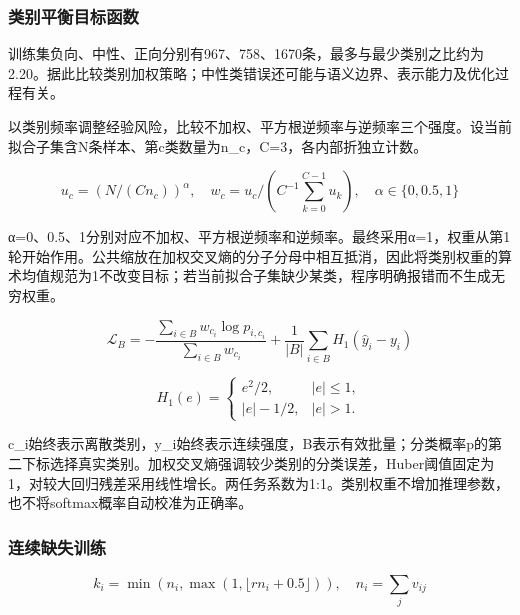 \hypertarget{q2-ux7c7bux522bux5e73ux8861ux76eeux6807ux51fdux6570}{%
\subsubsection{类别平衡目标函数}\label{q2-ux7c7bux522bux5e73ux8861ux76eeux6807ux51fdux6570}}

训练集负向、中性、正向分别有967、758、1670条，最多与最少类别之比约为2.20。据此比较类别加权策略；中性类错误还可能与语义边界、表示能力及优化过程有关。

以类别频率调整经验风险\cite{q2-ref6,q2-ref7}，比较不加权、平方根逆频率与逆频率三个强度。设当前拟合子集含N条样本、第c类数量为n\_c，C=3，各内部折独立计数。

\begin{equation}
u_c=(N/(C n_c))^\alpha,\quad w_c=u_c/(C^{-1}\sum_{k=0}^{C-1}u_k),\quad\alpha\in\{0,0.5,1\}\label{q2-eq11}
\end{equation}

α=0、0.5、1分别对应不加权、平方根逆频率和逆频率。最终采用α=1，权重从第1轮开始作用。公共缩放在加权交叉熵的分子分母中相互抵消，因此将类别权重的算术均值规范为1不改变目标；若当前拟合子集缺少某类，程序明确报错而不生成无穷权重。

\begin{equation}
\mathcal L_B=-\frac{\sum_{i\in B}w_{c_i}\log p_{i,c_i}}{\sum_{i\in B}w_{c_i}}+\frac{1}{|B|}\sum_{i\in B}H_1(\hat y_i-y_i)\label{q2-eq12}
\end{equation}

\begin{equation}
H_1(e)=\begin{cases}e^2/2,&|e|\le1,\\|e|-1/2,&|e|>1.\end{cases}\label{q2-eq13}
\end{equation}

c\_i始终表示离散类别，y\_i始终表示连续强度，B表示有效批量；分类概率p的第二下标选择真实类别。加权交叉熵强调较少类别的分类误差，Huber阈值固定为1，对较大回归残差采用线性增长。两任务系数为1:1。类别权重不增加推理参数，也不将softmax概率自动校准为正确率。

\hypertarget{q2-ux8fdeux7eedux7f3aux5931ux8badux7ec3}{%
\subsubsection{连续缺失训练}\label{q2-ux8fdeux7eedux7f3aux5931ux8badux7ec3}}

\begin{equation}
k_i=\min(n_i,\max(1,\lfloor r n_i+0.5\rfloor)),\quad n_i=\sum_jv_{ij}\label{q2-eq14}
\end{equation}

